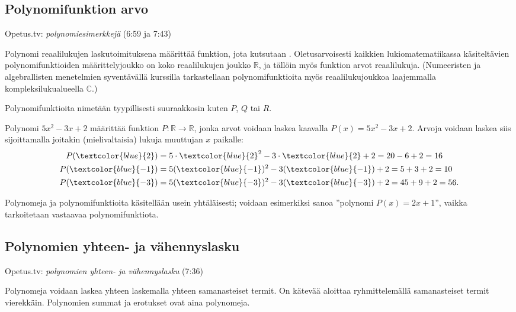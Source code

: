 \subsection*{Polynomifunktion arvo}

{Opetus.tv: \emph{polynomiesimerkkejä} (6:59 ja 7:43)}

Polynomi reaalilukujen laskutoimituksena määrittää funktion, jota kutsutaan . Oletusarvoisesti kaikkien lukiomatematiikassa käsiteltävien polynomifunktioiden määrittelyjoukko on koko reaalilukujen joukko $\mathbb{R}$, ja tällöin myös funktion arvot reaalilukuja. (Numeeristen ja algebrallisten menetelmien syventävällä kurssilla tarkastellaan polynomifunktioita myös reaalilukujoukkoa laajemmalla kompleksilukualueella $\mathbb{C}$.)

Polynomifunktioita nimetään tyypillisesti suuraakkosin kuten $P$, $Q$ tai $R$.

\begin{esimerkki}

Polynomi $5x^2-3x+2$ määrittää funktion $P:\mathbb{R}\rightarrow \mathbb{R}$, jonka arvot voidaan laskea kaavalla $P(x)=5x^2-3x+2$. Arvoja voidaan laskea siis sijoittamalla joitakin (mielivaltaisia) lukuja muuttujan $x$ paikalle:
\begin{align*}
    P(\textcolor{blue}{2}) & = 5\cdot \textcolor{blue}{2}^2-3\cdot \textcolor{blue}{2}+2 = 20 - 6 + 2 = 16 \\
    P(\textcolor{blue}{-1}) & = 5(\textcolor{blue}{-1})^2-3(\textcolor{blue}{-1})+2 = 5 + 3 + 2 = 10 \\
    P(\textcolor{blue}{-3}) & = 5(\textcolor{blue}{-3})^2-3(\textcolor{blue}{-3})+2 = 45 + 9 + 2 = 56.
\end{align*}
\end{esimerkki}

Polynomeja ja polynomifunktioita käsitellään usein yhtäläisesti; voidaan esimerkiksi sanoa ''polynomi $P(x)=2x+1$'', vaikka tarkoitetaan vastaavaa polynomifunktiota.

\subsection*{Polynomien yhteen- ja vähennyslasku}

{Opetus.tv: \emph{polynomien yhteen- ja vähennyslasku} (7:36)}

Polynomeja voidaan laskea yhteen laskemalla yhteen samanasteiset termit. On kätevää aloittaa ryhmittelemällä samanasteiset termit vierekkäin. Polynomien summat ja erotukset ovat aina polynomeja.

